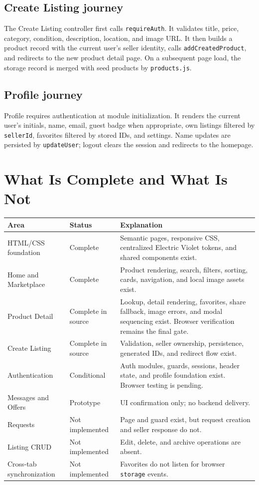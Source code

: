 \documentclass[10pt]{article}
\newcommand{\code}[1]{\texttt{#1}}
\begin{document}
\subsection{Create Listing journey}

The Create Listing controller first calls \code{requireAuth}. It validates title, price, category, condition, description, location, and image URL. It then builds a product record with the current user's seller identity, calls \code{addCreatedProduct}, and redirects to the new product detail page. On a subsequent page load, the storage record is merged with seed products by \code{products.js}.

\subsection{Profile journey}

Profile requires authentication at module initialization. It renders the current user's initials, name, email, guest badge when appropriate, own listings filtered by \code{sellerId}, favorites filtered by stored IDs, and settings. Name updates are persisted by \code{updateUser}; logout clears the session and redirects to the homepage.

\clearpage
\section{What Is Complete and What Is Not}

\begin{tabular}{@{}p{3.8cm}p{3.2cm}p{6.3cm}@{}}
\toprule
\textbf{Area} & \textbf{Status} & \textbf{Explanation} \\
\midrule
HTML/CSS foundation & Complete & Semantic pages, responsive CSS, centralized Electric Violet tokens, and shared components exist. \\
Home and Marketplace & Complete & Product rendering, search, filters, sorting, cards, navigation, and local image assets exist. \\
Product Detail & Complete in source & Lookup, detail rendering, favorites, share fallback, image errors, and modal sequencing exist. Browser verification remains the final gate. \\
Create Listing & Complete in source & Validation, seller ownership, persistence, generated IDs, and redirect flow exist. \\
Authentication & Conditional & Auth modules, guards, sessions, header state, and profile foundation exist. Browser testing is pending. \\
Messages and Offers & Prototype & UI confirmation only; no backend delivery. \\
Requests & Not implemented & Page and guard exist, but request creation and seller response do not. \\
Listing CRUD & Not implemented & Edit, delete, and archive operations are absent. \\
Cross-tab synchronization & Not implemented & Favorites do not listen for browser \code{storage} events. \\
\bottomrule
\end{tabular}
\end{document}
